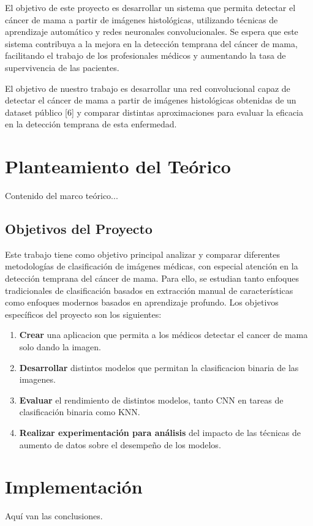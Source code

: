 \documentclass[12pt]{article} %
\begin{document}
El objetivo de este proyecto es desarrollar un sistema que permita detectar el cáncer de mama a partir de imágenes histológicas, utilizando técnicas de aprendizaje automático y redes neuronales convolucionales. Se espera que este sistema contribuya a la mejora en la detección temprana del cáncer de mama, facilitando el trabajo de los profesionales médicos y aumentando la tasa de supervivencia de las pacientes.

El objetivo de nuestro trabajo es desarrollar una red convolucional capaz de detectar el cáncer de mama a partir de imágenes histológicas obtenidas de un dataset público [6] y comparar distintas aproximaciones para evaluar la eficacia en la detección temprana de esta enfermedad.

\section{Planteamiento del Teórico}
Contenido del marco teórico...

\subsection{Objetivos del Proyecto}
Este trabajo tiene como objetivo principal analizar y comparar diferentes metodologías de clasificación de imágenes médicas, con especial atención en la detección temprana del cáncer de mama. Para ello, se estudian tanto enfoques tradicionales de clasificación basados en extracción manual de características como enfoques modernos basados en aprendizaje profundo. Los objetivos específicos del proyecto son los siguientes:\\


\begin{enumerate}
    \item \textbf{Crear} una aplicacion que permita a los médicos detectar el cancer de mama solo dando la imagen.
    \item \textbf{Desarrollar} distintos modelos que permitan la clasificacion binaria de las imagenes.
    \item \textbf{Evaluar} el rendimiento de distintos modelos, tanto CNN en tareas de clasificación binaria como KNN.
    \item \textbf{Realizar experimentación para análisis} del  impacto de las técnicas de aumento de datos sobre el desempeño de los modelos.

\end{enumerate}

\section{Implementación}
Aquí van las conclusiones.
\end{document}
